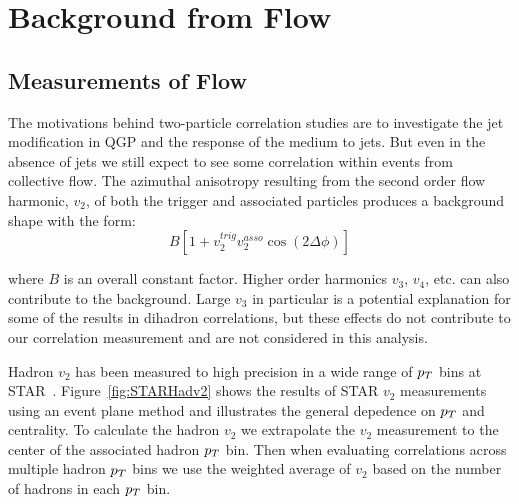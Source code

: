 \section{Background from Flow}

\subsection{Measurements of Flow}

The motivations behind two-particle correlation studies are to investigate the jet modification in QGP and the response of the medium to jets. But even in the absence of jets we still expect to see some correlation within events from collective flow. The azimuthal anisotropy resulting from the second order flow harmonic, $v_2$, of both the trigger and associated particles produces a background shape with the form:
\begin{equation}\label{eq:v2background}
 B[1 + v^{trig}_{2}v^{asso}_{2} \cos(2\Delta\phi)] 
\end{equation}

where $B$ is an overall constant factor. Higher order harmonics $v_3$, $v_4$, etc. can also contribute to the background. Large $v_3$ in particular is a potential explanation for some of the results in dihadron correlations, but these effects do not contribute to our correlation measurement and are not considered in this analysis. 

Hadron $v_2$ has been measured to high precision in a wide range of $p_{T}$ bins at STAR~\cite{STARhadv2}. Figure~\ref{fig:STARHadv2} shows the results of STAR $v_2$ measurements using an event plane method and illustrates the general depedence on $p_{T}$ and centrality. To calculate the hadron $v_2$ we extrapolate the $v_2$ measurement to the center of the associated hadron $p_{T}$ bin. Then when evaluating correlations across multiple hadron $p_{T}$ bins we use the weighted average of $v_2$ based on the number of hadrons in each $p_{T}$ bin.

